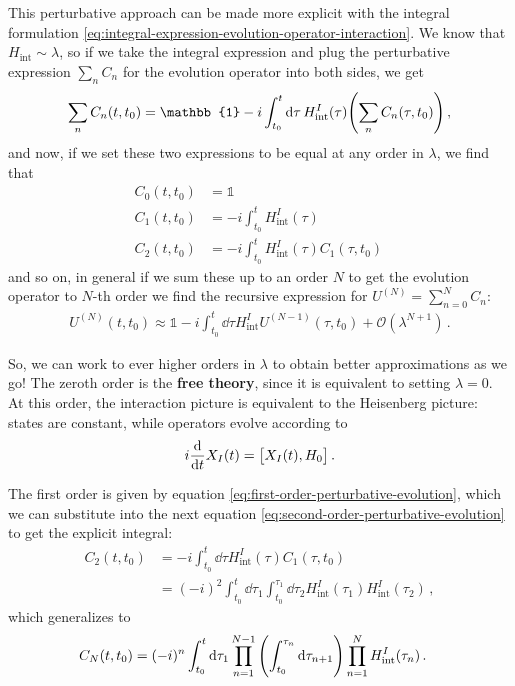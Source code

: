 \documentclass[main.tex]{subfiles}
\begin{document}
This perturbative approach can be made more explicit with the integral formulation \eqref{eq:integral-expression-evolution-operator-interaction}.
We know that \(H _{\text{int}} \sim \lambda \), so if we take the integral expression and plug the perturbative expression \(\sum _{n} C_n\) for the evolution operator into both sides, we get 
%
\begin{align}
\sum _{n} C_n(t, t_0 ) = \mathbb{1} - i \int_{t_0 }^{t} \dd{\tau }
H _{\text{int}}^{I} (\tau ) \qty(\sum _{n} C_n(\tau , t_0 ))
\,,
\end{align}
%
and now, if we set these two expressions to be equal at any order in \(\lambda \), we find that 
%
\begin{subequations}
\begin{align}
C_0 (t, t_0 ) &= \mathbb{1}   \\
C_1 (t, t_0 ) &=  - i \int_{t_0 }^{t} H _{\text{int}}^{I} (\tau) \label{eq:first-order-perturbative-evolution} \\
C_2 (t, t_0 ) &=  - i \int_{t_0 }^{t} H _{\text{int}}^{I} (\tau) C_1 (\tau , t_0 ) \label{eq:second-order-perturbative-evolution}
\,
\end{align}
\end{subequations}
%
and so on, in general if we sum these up to an order \(N\) to get the evolution operator to \(N\)-th order we find the recursive expression for \(U^{(N)} = \sum _{n=0}^{N} C_n\):
%
\begin{align}
U^{(N)} (t,  t_0  )
\approx \mathbb{1} - i \int_{t_0 }^{t} \dd{\tau } H _{\text{int}}^{I} U^{(N-1)} (\tau , t_0 ) + \mathcal{O} (\lambda^{N+1})
\,.
\end{align}

So, we can work to ever higher orders in \(\lambda \) to obtain better approximations as we go! 
The zeroth order is the \textbf{free theory}, since it is equivalent to setting \(\lambda = 0\). At this order, the interaction picture is equivalent to the Heisenberg picture: states are constant, while operators evolve according to 
%
\begin{align}
i \dv{}{t} X_I (t ) = \qty[X_I (t), H_0 ]
\,.
\end{align}

The first order is given by equation \eqref{eq:first-order-perturbative-evolution}, which we can substitute into the next equation \eqref{eq:second-order-perturbative-evolution} to get the explicit integral: 
%
\begin{subequations}
\begin{align}
C_2 (t, t_0 ) &=  
- i \int_{t_0 }^{t} \dd{\tau } H _{\text{int}}^{I} (\tau ) C_1 (\tau, t_0 )  \\ 
&= (-i)^2 \int_{t_0}^{t} \dd{\tau_1 } \int_{t_0 }^{\tau_1 } \dd{\tau_2 }
H _{\text{int}}^{I} (\tau_1 ) 
H _{\text{int}}^{I} (\tau_2 ) 
\label{eq:second-order-correction-no-time-ordering}
\,,
\end{align}
\end{subequations}
%
which generalizes to 
%
\begin{align}
C_N (t, t_0 ) &=
(-i)^{n}
\int_{t_0 }^{t} \dd{\tau_1 }
\prod_{n=1}^{N-1} \qty(\int_{t_0 }^{\tau_{n}} \dd{\tau_{n+1}})
\prod_{n=1}^{N} H _{\text{int}}^{I} (\tau_{n})
\,.
\end{align}
\end{document}
